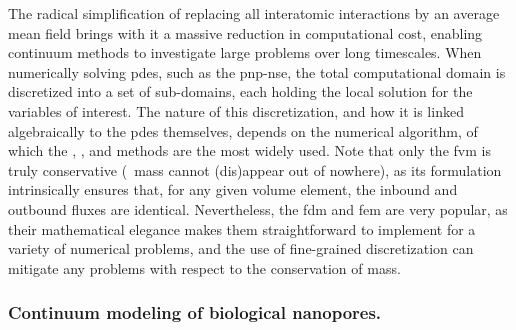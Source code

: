 The radical simplification of replacing all interatomic interactions by an average mean field brings with it a
massive reduction in computational cost, enabling continuum methods to investigate large problems over long
timescales. When numerically solving \glspl{pde}, such as the \gls{pnp-nse}, the total computational domain is
discretized into a set of sub-domains, each holding the local solution for the variables of interest. The
nature of this discretization, and how it is linked algebraically to the \glspl{pde} themselves, depends on
the numerical algorithm, of which the , , and  methods are the most widely used. Note that only the
\gls{fvm} is truly conservative (\ie~mass cannot (dis)appear out of nowhere), as its formulation intrinsically
ensures that, for any given volume element, the inbound and outbound fluxes are identical. Nevertheless, the
\gls{fdm} and \gls{fem} are very popular, as their mathematical elegance makes them straightforward to
implement for a variety of numerical problems, and the use of fine-grained discretization can mitigate any
problems with respect to the conservation of mass.


\subsubsection{Continuum modeling of biological nanopores.}
%

